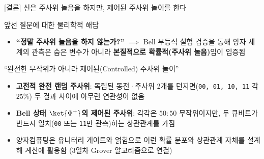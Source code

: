 \documentclass[aspectratio=169, 10pt]{beamer}
\begin{document}
\begin{frame}{[결론] 신은 주사위 놀음을 하지만, 제어된 주사위 놀이를 한다}
    \begin{qcblock}{앞선 질문에 대한 물리학적 해답}
        \begin{itemize}
            \item \textbf{``정말 주사위 놀음을 하지 않는가?''} $\implies$ Bell 부등식 실험 검증을 통해 양자 세계의 관측은 숨은 변수가 아니라 \textbf{본질적으로 확률적(주사위 놀음)}임이 입증됨
        \end{itemize}
    \end{qcblock}
    \pause
    \vspace{0.15cm}
    \begin{qcalert}{``완전한 무작위가 아니라 제어된(Controlled) 주사위 놀이''}
        \begin{itemize}
            \item \textbf{고전적 완전 랜덤 주사위}: 독립된 동전·주사위 2개를 던지면(\texttt{00, 01, 10, 11} 각 $25\%$) 두 결과 사이에 아무런 연관성이 없음
            \pause
            \item \textbf{Bell 상태 $\ket{\Phi^+}$의 제어된 주사위}: 각각은 $50:50$ 무작위이지만, 두 큐비트가 반드시 일치(\texttt{00} 또는 \texttt{11}만 관측)하는 상관관계를 가짐
            \pause
            \item 양자컴퓨팅은 유니터리 게이트와 얽힘으로 이런 확률 분포와 상관관계 자체를 설계해 계산에 활용함 (3일차 Grover 알고리즘으로 연결)
        \end{itemize}
    \end{qcalert}
\end{frame}
\end{document}
